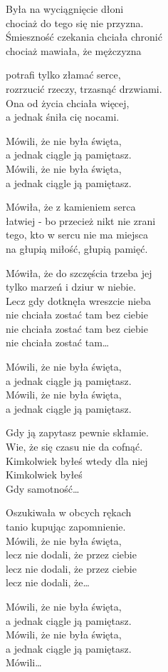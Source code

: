 {}
\begin{text}
    \begin{tinyTwelve}
\hfill\break
Była na wyciągnięcie dłoni\\
chociaż do tego się nie przyzna.\\
Śmieszność czekania chciała chronić\\
chociaż mawiała, że mężczyzna

potrafi tylko złamać serce,\\
rozrzucić rzeczy, trzasnąć drzwiami.\\
Ona od życia chciała więcej,\\
a jednak śniła cię nocami.

\vin Mówili, że nie była święta,\\
\vin a jednak ciągle ją pamiętasz.\\
\vin Mówili, że nie była święta,\\
\vin a jednak ciągle ją pamiętasz.

\hfill\break
Mówiła, że z kamieniem serca\\
łatwiej - bo przecież nikt nie zrani\\
tego, kto w sercu nie ma miejsca\\
na głupią miłość, głupią pamięć.

Mówiła, że do szczęścia trzeba jej\\
tylko marzeń i dziur w niebie.\\
Lecz gdy dotknęła wreszcie nieba\\
nie chciała zostać tam bez ciebie\\
nie chciała zostać tam bez ciebie\\
nie chciała zostać tam…

\hfill\break
\vin Mówili, że nie była święta,\\
\vin a jednak ciągle ją pamiętasz.\\
\vin Mówili, że nie była święta,\\
\vin a jednak ciągle ją pamiętasz.

\hfill\break
Gdy ją zapytasz pewnie skłamie.\\
Wie, że się czasu nie da cofnąć.\\
Kimkolwiek byłeś wtedy dla niej\\
Kimkolwiek byłeś\\
Gdy samotność…

\hfill\break
Oszukiwała w obcych rękach\\
tanio kupując zapomnienie.\\
Mówili, że nie była święta,\\
lecz nie dodali, że przez ciebie\\
lecz nie dodali, że przez ciebie\\
lecz nie dodali, że…

\hfill\break
\vin Mówili, że nie była święta,\\
\vin a jednak ciągle ją pamiętasz.\\
\vin Mówili, że nie była święta,\\
\vin a jednak ciągle ją pamiętasz.\\
\vin Mówili…
\end{tinyTwelve}
\end{text}
